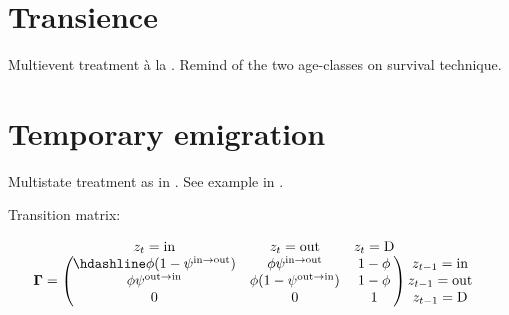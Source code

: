 \documentclass[
  12pt,
]{krantz}
\begin{document}
\section{Transience}\label{transience}

Multievent treatment à la \citet{genovart2019}. Remind of the two age-classes on survival technique.

\section{Temporary emigration}\label{temporary-emigration}

Multistate treatment as in \citet{schaub2004te}. See example in \citet{bancila2018te}.

Transition matrix:

\[\begin{matrix}
& \\
\mathbf{\Gamma} =
  \left ( \vphantom{ \begin{matrix} 12 \\ 12 \\ 12 \end{matrix} } \right .
          \end{matrix}
          \hspace{-1.2em}
          \begin{matrix}
          z_t=\text{in} & z_t=\text{out} & z_t=\text{D} \\ \hdashline
          \phi (1-\psi^{\text{in} \rightarrow \text{out}}) & \phi \psi^{\text{in} \rightarrow \text{out}} & 1 - \phi\\
          \phi \psi^{\text{out} \rightarrow \text{in}} & \phi (1-\psi^{\text{out} \rightarrow \text{in}}) & 1 - \phi\\
          0 & 0 & 1
          \end{matrix}
          \hspace{-0.2em}
          \begin{matrix}
          & \\
          \left . \vphantom{ \begin{matrix} 12 \\ 12 \\ 12 \end{matrix} } \right )
\begin{matrix}
z_{t-1}=\text{in} \\ z_{t-1}=\text{out} \\ z_{t-1}=\text{D}
\end{matrix}
\end{matrix}\]
\end{document}
